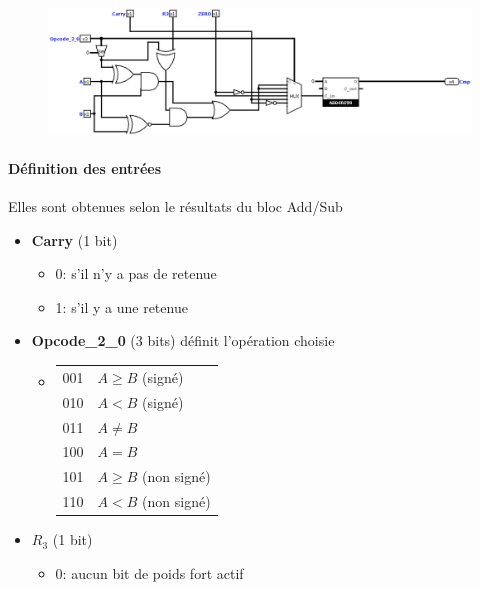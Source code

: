 \documentclass[a4paper]{article}
\begin{document}
\begin{tcolorbox}[colframe=Monokaimagenta,colback=white]

\begin{figure}[H]
    \centering
    \includegraphics[width=\textwidth]{src/COMPATEUR.png}
    \label{fig:OVERFADDSUB_4BITS}
\end{figure}

\paragraph{Définition des entrées}
Elles sont obtenues selon le résultats du bloc Add/Sub
\begin{itemize}
\item \textbf{Carry} (1 bit)
     \begin{itemize}
            \item 0: s'il n'y a pas de retenue
            \item 1: s'il y a une retenue
        \end{itemize}
\item \textbf{Opcode\_2\_0} (3 bits) définit l'opération choisie
     \begin{itemize}
            \item \begin{tabular}{ |l | l| }
                    001   & $A \ge B$ (signé) \\
                    010   & $A < B$ (signé) \\
                    011   & $A \ne B$\\
                    100   & $A = B$ \\
                    101   & $A \ge B$ (non signé) \\
                    110   & $A < B$ (non signé) \\
    \end{tabular}
        \end{itemize}
\item $R_3$ (1 bit) 
\begin{itemize}
            \item 0: aucun bit de poids fort actif

\end{itemize}
\end{itemize}
\end{tcolorbox}
\end{document}
